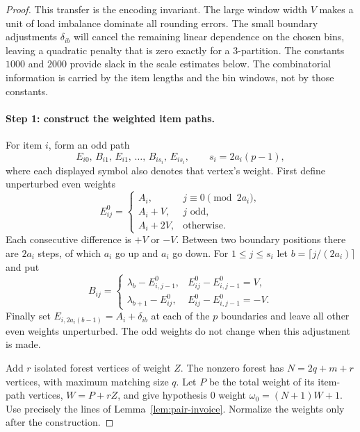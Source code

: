 \begin{proof}
This transfer is the encoding invariant. The large window width $V$
makes a unit of load imbalance dominate all rounding errors. The
small boundary adjustments $\delta_{ib}$ will cancel the remaining
linear dependence on the chosen bins, leaving a quadratic penalty
that is zero exactly for a 3-partition.
The constants $1000$ and $2000$ provide slack in the scale
estimates below. The combinatorial information is carried by
the item lengths and the bin windows, not by those constants.

\paragraph{Step 1: construct the weighted item paths.}
For item $i$, form an odd path
\[
 E_{i0},\,B_{i1},\,E_{i1},\,\ldots,\,
 B_{is_i},\,E_{is_i},\qquad s_i=2a_i(p-1),
\]
where each displayed symbol also denotes that vertex's weight.
First define unperturbed even weights
\[
 E^0_{ij}=
 \begin{cases}
 A_i,&j\equiv0\pmod{2a_i},\\
 A_i+V,&j\text{ odd},\\
 A_i+2V,&\text{otherwise}.
 \end{cases}
\]
Each consecutive difference is $+V$ or $-V$.
Between two boundary positions there are $2a_i$ steps,
of which $a_i$ go up and $a_i$ go down.
For $1\le j\le s_i$ let $b=\lceil j/(2a_i)\rceil$ and put
\[
 B_{ij}=
 \begin{cases}
 \lambda_b-E^0_{i,j-1},&E^0_{ij}-E^0_{i,j-1}=V,\\
 \lambda_{b+1}-E^0_{ij},&E^0_{ij}-E^0_{i,j-1}=-V.
 \end{cases}
\]
Finally set
$E_{i,2a_i(b-1)}=A_i+\delta_{ib}$ at each of the $p$ boundaries
and leave all other even weights unperturbed.
The odd weights do not change when this adjustment is made.

Add $r$ isolated forest vertices of weight $Z$.
The nonzero forest has $N=2q+m+r$ vertices, with maximum matching
size $q$. Let $P$ be the total weight of its item-path vertices,
$W=P+rZ$, and give hypothesis $0$ weight
$\omega_0=(N+1)W+1$.
Use precisely the lines of Lemma~\ref{lem:pair-invoice}.
Normalize the weights only after the construction.


\end{proof}
